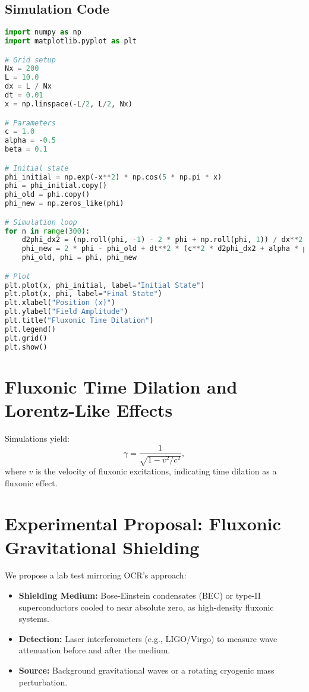 \documentclass{article}
\begin{document}
\subsection{Simulation Code}
\begin{lstlisting}[language=Python, caption=Fluxonic Time Dilation Simulation, label=lst:timedilation]
import numpy as np
import matplotlib.pyplot as plt

# Grid setup
Nx = 200
L = 10.0
dx = L / Nx
dt = 0.01
x = np.linspace(-L/2, L/2, Nx)

# Parameters
c = 1.0
alpha = -0.5
beta = 0.1

# Initial state
phi_initial = np.exp(-x**2) * np.cos(5 * np.pi * x)
phi = phi_initial.copy()
phi_old = phi.copy()
phi_new = np.zeros_like(phi)

# Simulation loop
for n in range(300):
    d2phi_dx2 = (np.roll(phi, -1) - 2 * phi + np.roll(phi, 1)) / dx**2  # Periodic boundaries
    phi_new = 2 * phi - phi_old + dt**2 * (c**2 * d2phi_dx2 + alpha * phi + beta * phi**3)
    phi_old, phi = phi, phi_new

# Plot
plt.plot(x, phi_initial, label="Initial State")
plt.plot(x, phi, label="Final State")
plt.xlabel("Position (x)")
plt.ylabel("Field Amplitude")
plt.title("Fluxonic Time Dilation")
plt.legend()
plt.grid()
plt.show()
\end{lstlisting}

\section{Fluxonic Time Dilation and Lorentz-Like Effects}
Simulations yield:
\begin{equation}
\gamma = \frac{1}{\sqrt{1 - v^2/c^2}},
\end{equation}
where \(v\) is the velocity of fluxonic excitations, indicating time dilation as a fluxonic effect.

\section{Experimental Proposal: Fluxonic Gravitational Shielding}
We propose a lab test mirroring OCR’s approach:
\begin{itemize}
    \item \textbf{Shielding Medium:} Bose-Einstein condensates (BEC) or type-II superconductors cooled to near absolute zero, as high-density fluxonic systems.
    \item \textbf{Detection:} Laser interferometers (e.g., LIGO/Virgo) to measure wave attenuation before and after the medium.
    \item \textbf{Source:} Background gravitational waves or a rotating cryogenic mass perturbation.
\end{itemize}
\end{document}
